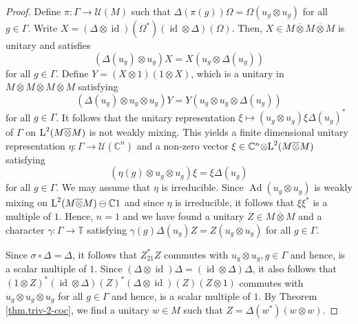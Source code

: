 \documentclass[a4paper,11pt]{amsart}
\numberwithin{equation}{section}
\begin{document}
\begin{proof}
Define $\pi : \Gamma {\rightarrow} {\mathcal{U}}(M)$ such that ${\Delta}(\pi(g)) \Omega = \Omega(u_g {\otimes} u_g)$ for all $g \in \Gamma$. Write $X = ({\Delta} {\otimes} {\mathord{\operatorname{id}}})({\Omega}^*)({\mathord{\operatorname{id}}} {\otimes} {\Delta})({\Omega})$. Then, $X \in M {\mathbin{\overline{\otimes}}} M {\mathbin{\overline{\otimes}}} M$ is unitary and satisfies
\begin{equation}\label{eq.eqX}
({\Delta}(u_g) {\otimes} u_g) X = X (u_g {\otimes} {\Delta}(u_g))
\end{equation}
for all $g \in \Gamma$. Define $Y = (X {\otimes} 1) (1 {\otimes} X)$, which is a unitary in $M {\mathbin{\overline{\otimes}}} M {\mathbin{\overline{\otimes}}} M {\mathbin{\overline{\otimes}}} M$ satisfying
$$({\Delta}(u_g) {\otimes} u_g {\otimes} u_g) Y = Y (u_g {\otimes} u_g {\otimes} {\Delta}(u_g))$$
for all $g \in \Gamma$. It follows that the unitary representation $\xi \mapsto (u_g {\otimes} u_g) \xi {\Delta}(u_g)^*$ of $\Gamma$ on ${\mathord{\text{\rm L}}}^2(M {\mathbin{\overline{\otimes}}} M)$ is not weakly mixing. This yields a finite dimensional unitary representation $\eta : \Gamma {\rightarrow} {\mathcal{U}}({\mathbb{C}}^n)$ and a non-zero vector $\xi \in {\mathbb{C}}^n {\otimes} {\mathord{\text{\rm L}}}^2(M {\mathbin{\overline{\otimes}}} M)$ satisfying
$$(\eta(g) {\otimes} u_g {\otimes} u_g) \xi = \xi {\Delta}(u_g)$$
for all $g \in \Gamma$. We may assume that $\eta$ is irreducible. Since ${\operatorname{Ad}} (u_g {\otimes} u_g)$ is weakly mixing on ${\mathord{\text{\rm L}}}^2(M {\mathbin{\overline{\otimes}}} M) \ominus {\mathbb{C}} 1$ and since $\eta$ is irreducible, it follows that $\xi \xi^*$ is a multiple of $1$. Hence, $n = 1$ and we have found a unitary $Z \in M {\mathbin{\overline{\otimes}}} M$ and a character $\gamma : \Gamma {\rightarrow} {\mathbb{T}}$ satisfying $\gamma(g) {\Delta}(u_g) Z = Z(u_g {\otimes} u_g)$ for all $g \in \Gamma$.

Since ${\sigma} \circ {\Delta} = {\Delta}$, it follows that $Z_{21}^* Z$ commutes with $u_g {\otimes} u_g, g \in \Gamma$ and hence, is a scalar multiple of $1$. Since $({\Delta} {\otimes} {\mathord{\operatorname{id}}}) {\Delta} = ({\mathord{\operatorname{id}}} {\otimes} {\Delta}) {\Delta}$, it also follows that $(1 {\otimes} Z)^* ({\mathord{\operatorname{id}}} {\otimes} {\Delta})(Z)^*({\Delta} {\otimes} {\mathord{\operatorname{id}}})(Z)(Z {\otimes} 1)$ commutes with $u_g {\otimes} u_g {\otimes} u_g$ for all $g \in \Gamma$ and hence, is a scalar multiple of $1$. By Theorem \ref{thm.triv-2-coc}, we find a unitary $w \in M$ such that $Z = {\Delta}(w^*) (w {\otimes} w)$.


\end{proof}
\end{document}
